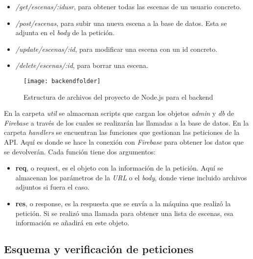 \begin{itemize}
    \item \textit{/get/escenas/:idusr}, para obtener todas las escenas de un usuario concreto.
    \item \textit{/post/escenas}, para subir una nueva escena a la base de datos. Esta se adjunta en el \textit{body} de la petición.
    \item \textit{/update/escenas/:id}, para modificar una escena con un id concreto.
    \item \textit{/delete/escenas/:id}, para borrar una escena.
\end{itemize}

\begin{figure}[h]
    \centering
    \texttt{[image: backendfolder]}
    \caption[Estructura de archivos de backend]{Estructura de archivos del proyecto de Node.js para el backend}
    \label{fig:backendfolder}
\end{figure}

En la carpeta \textit{util} se almacenan scripts que cargan los objetos \textit{admin} y \textit{db} de \textit{Firebase} a través de los cuales se realizarán las llamadas a la base de datos. En la carpeta \textit{handlers} se encuentran las funciones que gestionan las peticiones de la API. Aquí es donde se hace la conexión con \textit{Firebase} para obtener los datos que se devolverán. Cada función tiene dos argumentos:

\begin{itemize}
    \item \textbf{req}, o request, es el objeto con la información de la petición. Aquí se almacenan los parámetros de la \textit{URL} o el \textit{body}, donde viene incluido archivos adjuntos si fuera el caso.
    \item \textbf{res}, o response, es la respuesta que se envía a la máquina que realizó la petición. Si se realizó una llamada para obtener una lista de escenas, esa información se añadirá en este objeto.
\end{itemize}

\subsection{Esquema y verificación de peticiones}

